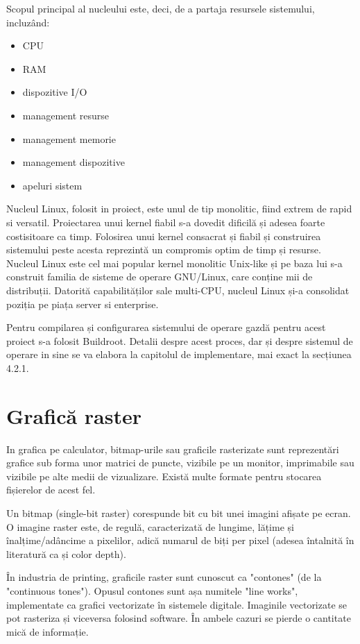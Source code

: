 \documentclass[a4paper, 12pt, twoside]{report}
\begin{document}
Scopul principal al nucleului este, deci, de a partaja resursele sistemului, incluzând:
\begin{itemize}
\item CPU
\item RAM
\item dispozitive I/O
\item management resurse
\item management memorie
\item management dispozitive
\item apeluri sistem
\end{itemize}

Nucleul Linux, folosit in proiect, este unul de tip monolitic, fiind extrem de rapid si versatil. Proiectarea unui kernel fiabil s-a dovedit dificilă și adesea foarte costisitoare ca timp. Folosirea unui kernel consacrat și fiabil și construirea sistemului peste acesta reprezintă un compromis optim de timp și resurse. Nucleul Linux este cel mai popular kernel monolitic Unix-like și pe baza lui s-a construit familia de sisteme de operare GNU/Linux, care conține mii de distribuții. Datorită capabilităților sale multi-CPU, nucleul Linux și-a consolidat poziția pe piața server si enterprise.

Pentru compilarea și configurarea sistemului de operare gazdă pentru acest proiect s-a folosit Buildroot. Detalii despre acest proces, dar și despre sistemul de operare in sine se va elabora la capitolul de implementare, mai exact la secțiunea 4.2.1.


	\section{Grafică raster}
In grafica pe calculator, bitmap-urile sau graficile rasterizate sunt reprezentări grafice sub forma unor matrici de puncte, vizibile pe un monitor, imprimabile sau vizibile pe alte medii de vizualizare. Există multe formate pentru stocarea fișierelor de acest fel.

Un bitmap (single-bit raster) corespunde bit cu bit unei imagini afișate pe ecran. O imagine raster este, de regulă, caracterizată de lungime, lățime și înalțime/adâncime a pixelilor, adică numarul de biți per pixel (adesea întalnită în literatură ca și color depth).

În industria de printing, graficile raster sunt cunoscut ca "contones" (de la "continuous tones"). Opusul contones sunt așa numitele "line works", implementate ca grafici vectorizate în sistemele digitale. Imaginile vectorizate se pot rasteriza și viceversa folosind software. În ambele cazuri se pierde o cantitate mică de informație.
\end{document}
